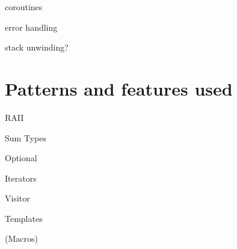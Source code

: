             coroutines %
            
            error handling
            
            stack unwinding?
    
    \section{Patterns and features used}
    
        RAII
        
        Sum Types
        
        Optional
        
        Iterators
        
        Visitor
        
        Templates
        
        (Macros)
